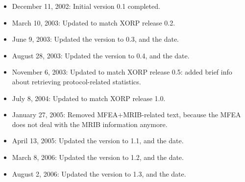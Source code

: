 \documentclass[11pt]{article}
\begin{document}
\begin{itemize}

  \item December 11, 2002: Initial version 0.1 completed.

  \item March 10, 2003: Updated to match XORP release 0.2.

  \item June 9, 2003: Updated the version to 0.3, and the date.

  \item August 28, 2003: Updated the version to 0.4, and the date.

  \item November 6, 2003: Updated to match XORP release 0.5: added brief info
  about retrieving protocol-related statistics.

  \item July 8, 2004: Updated to match XORP release 1.0.

  \item January 27, 2005: Removed MFEA+MRIB-related text, because the MFEA
  does not deal with the MRIB information anymore.

  \item April 13, 2005: Updated the version to 1.1, and the date.

  \item March 8, 2006: Updated the version to 1.2, and the date.

  \item August 2, 2006: Updated the version to 1.3, and the date.

\end{itemize}




\end{document}
